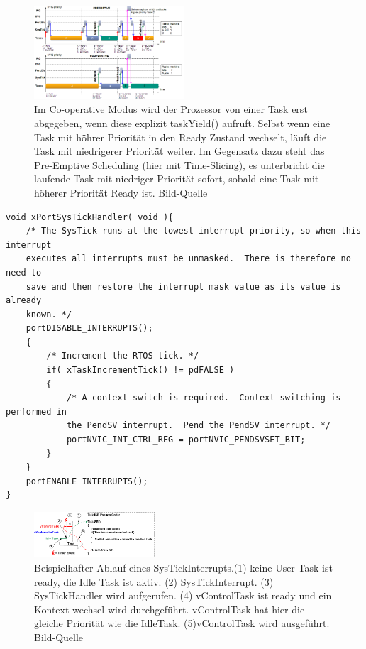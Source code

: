 \begin{figure}[htb]
	\centering
		\includegraphics[width=0.5\textwidth]{Pictures/EMCUIT/PreemptiveCooperative.png}
	\caption{Im Co-operative Modus wird der Prozessor von einer Task erst abgegeben, wenn diese explizit taskYield() aufruft. Selbst wenn eine Task mit höhrer Priorität in den Ready Zustand wechselt, läuft die Task mit niedrigerer Priorität weiter. Im Gegensatz dazu steht das Pre-Emptive Scheduling (hier mit Time-Slicing), es unterbricht die laufende Task mit niedriger Priorität sofort, sobald eine Task mit höherer Priorität Ready ist. Bild-Quelle~\protect{}}
	\label{fig:PreVSCo}
\end{figure}
\begin{lstlisting}[caption={FreeRTOS Source des SysTickHandlers aus Task.c. Der SysTickHandler verwaltet den TickCount. Der TickCount dient allen Timingfunktionen des RTOS Kernels als Zeitreferenz. Des Weiteren wird bei aktivem Time Slicing überprüft ob ein Kontextwechsel nötig ist. Der Kontext wechsel wir dann ggf. durch den PendSVHandler durchgeführt.}, linewidth=8cm,captionpos=b, label=lst:SysTickS, float=hbt]
void xPortSysTickHandler( void ){
	/* The SysTick runs at the lowest interrupt priority, so when this interrupt
	executes all interrupts must be unmasked.  There is therefore no need to
	save and then restore the interrupt mask value as its value is already
	known. */
	portDISABLE_INTERRUPTS();
	{
		/* Increment the RTOS tick. */
		if( xTaskIncrementTick() != pdFALSE )
		{
			/* A context switch is required.  Context switching is performed in
			the PendSV interrupt.  Pend the PendSV interrupt. */
			portNVIC_INT_CTRL_REG = portNVIC_PENDSVSET_BIT;
		}
	}
	portENABLE_INTERRUPTS();
}
\end{lstlisting}
\begin{figure}[htb]
	\centering
		\includegraphics[width=0.4\textwidth]{Pictures/FreeRTOSOrg/TickISR.png}
	\caption{Beispielhafter Ablauf eines SysTickInterrupts.(1) keine User Task ist ready, die Idle Task ist aktiv. (2) SysTickInterrupt. (3) SysTickHandler wird aufgerufen. (4) vControlTask ist ready und ein Kontext wechsel wird durchgeführt. vControlTask hat hier die gleiche Priorität wie die IdleTask. (5)vControlTask wird ausgeführt. Bild-Quelle~\protect{}}
	\label{fig:SysTick}
\end{figure}

